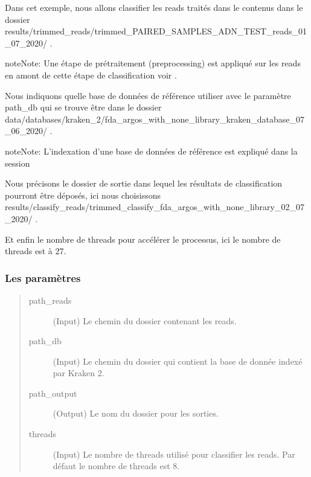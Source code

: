 \documentclass[letterpaper,10pt,french]{sphinxmanual}
\begin{document}
Dans cet exemple, nous allons classifier les reads traités dans le contenus dans le dossier results/trimmed\_reads/trimmed\_PAIRED\_SAMPLES\_ADN\_TEST\_reads\_01\_07\_2020/ .

\begin{sphinxadmonition}{note}{Note:}
Une étape de pré\sphinxhyphen{}traitement (pre\sphinxhyphen{}processing) est appliqué sur les reads en amont de cette étape de classification voir {\hyperref[\detokenize{tutorial:pre-processing}]{}}.
\end{sphinxadmonition}

Nous indiquons quelle base de données de référence utiliser avec le paramètre \sphinxhyphen{}path\_db qui se trouve être dans le dossier data/databases/kraken\_2/fda\_argos\_with\_none\_library\_kraken\_database\_07\_06\_2020/ .

\begin{sphinxadmonition}{note}{Note:}
L’indexation d’une base de données de référence est expliqué dans la session {\hyperref[\detokenize{tutorial:indexation-kraken2}]{}}
\end{sphinxadmonition}

Nous précisons le dossier de sortie dans lequel les résultats de classification pourront être déposés, ici nous choisissons results/classify\_reads/trimmed\_classify\_fda\_argos\_with\_none\_library\_02\_07\_2020/ .

Et enfin le nombre de threads pour accélérer le processus, ici le nombre de threads est à 27.


\subsubsection{Les paramètres}
\label{\detokenize{tutorial:id29}}\begin{quote}\begin{description}
\item[{\sphinxhyphen{}path\_reads}] \leavevmode
(Input) Le chemin du dossier contenant les reads.

\item[{\sphinxhyphen{}path\_db}] \leavevmode
(Input) Le chemin du dossier qui contient la base de donnée indexé par Kraken 2.

\item[{\sphinxhyphen{}path\_output}] \leavevmode
(Output) Le nom du dossier pour les sorties.

\item[{\sphinxhyphen{}threads}] \leavevmode
(Input) Le nombre de threads utilisé pour classifier les reads. Par défaut le nombre de threads est 8.

\end{description}\end{quote}
\end{document}
